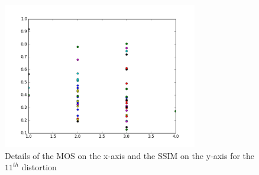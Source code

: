 \documentclass{article}
\begin{document}
\begin{figure}[ht]
  \centering
  \includegraphics[width=8.5cm]{figures/ssim_detail_11}
  \caption{Details of the MOS on the x-axis and the SSIM on the y-axis for the $11^{th}$ distortion \label{fig:ssim_detail_11} }
\end{figure}
\end{document}
